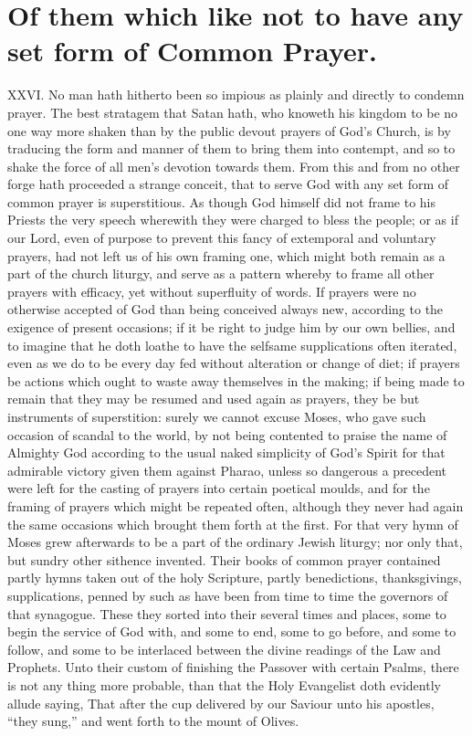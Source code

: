 \section*{Of them which like not to have any set form of Common Prayer.}
XXVI. No man hath hitherto been so impious as plainly and directly to condemn prayer. The best stratagem that Satan hath, who knoweth his kingdom to be no one way more  shaken than by the public devout prayers of God’s Church, is by traducing the form and manner of them to bring them into contempt, and so to shake the force of all men’s devotion towards them. From this and from no other forge hath proceeded a strange conceit, that to serve God with any set form of common prayer is superstitious.
As though God himself did not frame to his Priests the very speech wherewith they were charged to bless the people; or as if our Lord, even of purpose to prevent this fancy of extemporal and voluntary prayers, had not left us of his own framing one, which might both remain as a part of the church liturgy, and serve as a pattern whereby to frame all other prayers with efficacy, yet without superfluity of words. If prayers were no otherwise accepted of God than being conceived always new, according to the exigence of present occasions; if it be right to judge him by our own bellies, and to imagine that he doth loathe to have the selfsame supplications often iterated, even as we do to be every day fed without alteration or change of diet; if prayers be actions which ought to waste away themselves in the making; if being made to remain that they may be resumed and used again as prayers, they be but instruments of superstition: surely we cannot excuse Moses, who gave such occasion of scandal to the world, by not being contented to praise the name of Almighty God according to the usual naked simplicity of God’s Spirit for that admirable victory given them against Pharao, unless so dangerous a precedent were left for the casting of prayers into certain poetical moulds, and for the framing of prayers which might be repeated often, although they never had again the same occasions which brought them forth at the first. For that very hymn of Moses grew afterwards to be a part of the ordinary Jewish liturgy; nor only that, but sundry other sithence invented.  Their books of common prayer contained partly hymns taken out of the holy Scripture, partly benedictions, thanksgivings, supplications, penned by such as have been from time to time the governors of that synagogue. These they sorted into their several times and places, some to begin the service of God with, and some to end, some to go before, and some to follow, and some to be interlaced between the divine readings of the Law and Prophets. Unto their custom of finishing the Passover with certain Psalms, there is not any thing more probable, than that the Holy Evangelist doth evidently allude saying, That after the cup delivered by our Saviour unto his apostles, “they sung,” and went forth to the mount of Olives.
